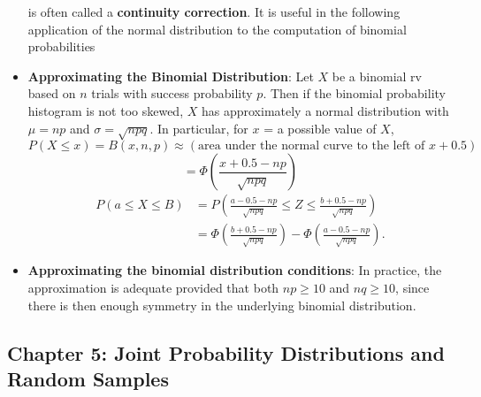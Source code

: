 \documentclass{report}
\begin{document}
\begin{itemize}
        is often called a \textbf{continuity correction}. It is useful in the following application of the normal distribution to the computation of binomial probabilities
    \item \textbf{Approximating the Binomial Distribution}:
        Let \( X \) be a binomial rv based on \( n \) trials with success probability \( p \). Then if the binomial probability histogram is not too skewed, \( X \) has approximately a normal distribution with \( \mu = np \) and \( \sigma = \sqrt{npq} \). In particular, for \( x \) = a possible value of \( X \),
        \[
            P(X \leq x) = B(x, n, p) \approx \left( \text{area under the normal curve to the left of } x + 0.5 \right)
        \]
        \[
            = \Phi \left( \frac{x + 0.5 - np}{\sqrt{npq}} \right)
        \]
        \begin{align*}
            P(a \leq X \leq B) &= P\left(\frac{a - 0.5 - np}{\sqrt{npq}} \leq Z \leq \frac{b + 0.5 - np}{\sqrt{npq}}\right) \\
            &=\Phi\left(\frac{b+0.5-np}{\sqrt{npq}}\right) - \Phi\left(\frac{a-0.5-np}{\sqrt{npq}}\right)
        .\end{align*}
    \item \textbf{Approximating the binomial distribution conditions}:
        In practice, the approximation is adequate provided that both \( np \geq 10 \) and \( nq \geq 10 \), since there is then enough symmetry in the underlying binomial distribution.
    \end{itemize}

    \pagebreak 
    \subsection{Chapter 5: Joint Probability Distributions and Random Samples}
    \bigbreak \noindent 
\end{document}
